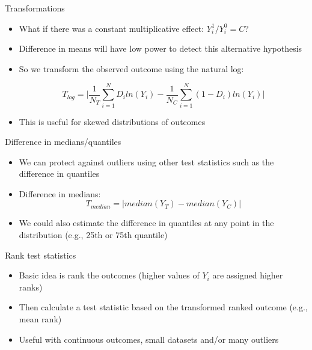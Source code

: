 \documentclass{beamer}
\begin{document}
\begin{frame}{Transformations}

\begin{itemize}
\item What if there was a constant multiplicative effect: $Y_i^1 / Y_i^0 = C$?
\item Difference in means will have low power to detect this alternative hypothesis
\item So we transform the observed outcome using the natural log:

$$T_{log} = \bigg | \frac{1}{N_T} \sum_{i=1}^N D_i ln(Y_i) - \frac{1}{N_C} \sum_{i=1}^N (1-D_i) ln(Y_i) \bigg |$$
\item This is useful for skewed distributions of outcomes

\end{itemize}

\end{frame}

\begin{frame}{Difference in medians/quantiles}

\begin{itemize}
\item We can protect against outliers using other test statistics such as the difference in quantiles
\item Difference in medians:$$T_{median} = | median(Y_T) - median(Y_C)|$$
\item We could also estimate the difference in quantiles at any point in the distribution (e.g., 25th or 75th quantile)
\end{itemize}

\end{frame}

\begin{frame}{Rank test statistics}

\begin{itemize}
\item Basic idea is rank the outcomes (higher values of $Y_i$ are assigned higher ranks) 
\item Then calculate a test statistic based on the transformed ranked outcome (e.g., mean rank)
\item Useful with continuous outcomes, small datasets and/or many outliers
\end{itemize}

\end{frame}
\end{document}
